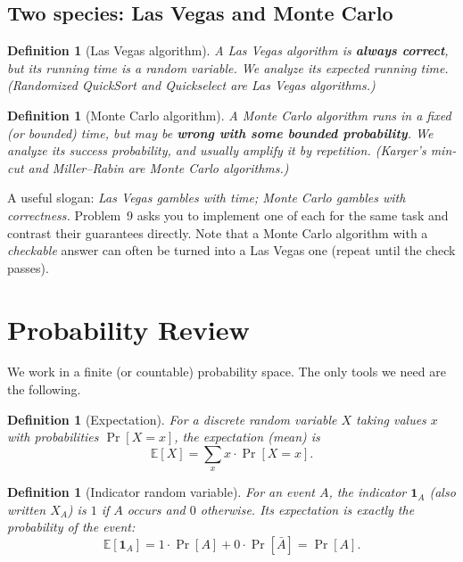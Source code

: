\documentclass[11pt]{article}
\newtheorem{definition}[theorem]{Definition}
\begin{document}
\subsection{Two species: Las Vegas and Monte Carlo}

\begin{definition}[Las Vegas algorithm]
A \emph{Las Vegas} algorithm is \textbf{always correct}, but its running time is a
random variable. We analyze its \emph{expected} running time. (Randomized
QuickSort and Quickselect are Las Vegas algorithms.)
\end{definition}

\begin{definition}[Monte Carlo algorithm]
A \emph{Monte Carlo} algorithm runs in a fixed (or bounded) time, but may be
\textbf{wrong with some bounded probability}. We analyze its \emph{success
probability}, and usually \emph{amplify} it by repetition. (Karger's min-cut and
Miller--Rabin are Monte Carlo algorithms.)
\end{definition}

A useful slogan: \emph{Las Vegas gambles with time; Monte Carlo gambles with
correctness.} Problem~9 asks you to implement one of each for the same task and
contrast their guarantees directly. Note that a Monte Carlo algorithm with a
\emph{checkable} answer can often be turned into a Las Vegas one (repeat until the
check passes).

\section{Probability Review}

We work in a finite (or countable) probability space. The only tools we need are
the following.

\begin{definition}[Expectation]
For a discrete random variable $X$ taking values $x$ with probabilities
$\Pr[X = x]$, the \emph{expectation} (mean) is
\[
    \mathbb{E}[X] = \sum_{x} x \cdot \Pr[X = x].
\]
\end{definition}

\begin{definition}[Indicator random variable]
For an event $A$, the \emph{indicator} $\mathbf{1}_A$ (also written $X_A$) is $1$
if $A$ occurs and $0$ otherwise. Its expectation is exactly the probability of the
event:
\[
    \mathbb{E}[\mathbf{1}_A] = 1 \cdot \Pr[A] + 0 \cdot \Pr[\bar A] = \Pr[A].
\]
\end{definition}
\end{document}
